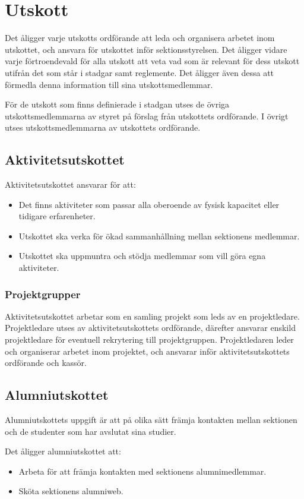 \documentclass{datateknologsektionen-document}
\begin{document}
\section{Utskott}
Det åligger varje utskotts ordförande att leda och organisera arbetet inom utskottet, och
ansvara för utskottet inför sektionsstyrelsen. Det åligger vidare varje förtroendevald
för alla utskott att veta vad som är relevant för dess utskott utifrån det som står i
stadgar samt reglemente. Det åligger även dessa att förmedla denna information till
sina utskottsmedlemmar.

För de utskott som finns definierade i stadgan utses de övriga utskottsmedlemmarna av
styret på förslag från utskottets ordförande. I övrigt utses utskottsmedlemmarna av
utskottets ordförande.

\subsection{Aktivitetsutskottet}
Aktivitetsutskottet ansvarar för att:
\begin{itemize}
  \item Det finns aktiviteter som passar alla oberoende av fysisk kapacitet eller tidigare erfarenheter.
  \item Utskottet ska verka för ökad sammanhållning mellan sektionens medlemmar.
  \item Utskottet ska uppmuntra och stödja medlemmar som vill göra egna aktiviteter.
\end{itemize}

\subsubsection{Projektgrupper}
Aktivitetsutskottet arbetar som en samling projekt som leds av en projektledare.
Projektledare utses av aktivitetsutskottets ordförande, därefter ansvarar enskild
projektledare för eventuell rekrytering till projektgruppen. Projektledaren leder och
organiserar arbetet inom projektet, och ansvarar inför aktivitetsutskottets
ordförande och kassör.

\subsection{Alumniutskottet}
Alumniutskottets uppgift är att på olika sätt främja kontakten mellan sektionen
och de studenter som har avslutat sina studier.

Det åligger alumniutskottet att:
\begin{itemize}
  \item Arbeta för att främja kontakten med sektionens alumnimedlemmar.
  \item Sköta sektionens alumniweb.
\end{itemize}
\end{document}

